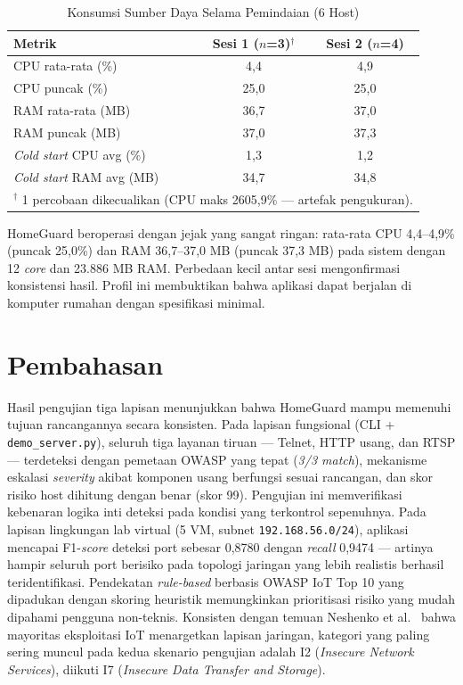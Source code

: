 \documentclass[conference]{IEEEtran}
\begin{document}
\begin{table}[htbp]
\caption{Konsumsi Sumber Daya Selama Pemindaian (6 Host)}
\label{tab:resource}
\renewcommand{\arraystretch}{1.2}
\begin{tabular}{|l|c|c|}
\hline
\textbf{Metrik} & \textbf{Sesi 1 ($n$=3)$^\dagger$} & \textbf{Sesi 2 ($n$=4)} \\
\hline
CPU rata-rata (\%) & 4,4 & 4,9 \\
\hline
CPU puncak (\%)    & 25,0 & 25,0 \\
\hline
RAM rata-rata (MB) & 36,7 & 37,0 \\
\hline
RAM puncak (MB)    & 37,0 & 37,3 \\
\hline
\textit{Cold start} CPU avg (\%) & 1,3 & 1,2 \\
\hline
\textit{Cold start} RAM avg (MB) & 34,7 & 34,8 \\
\hline
\multicolumn{3}{|l|}{$^\dagger$ 1 percobaan dikecualikan (CPU maks 2605,9\% --- artefak pengukuran).} \\
\hline
\end{tabular}
\end{table}

HomeGuard beroperasi dengan jejak yang sangat ringan: rata-rata CPU 4,4--4,9\% (puncak 25,0\%) dan RAM 36,7--37,0 MB (puncak 37,3 MB) pada sistem dengan 12 \textit{core} dan 23.886 MB RAM. Perbedaan kecil antar sesi mengonfirmasi konsistensi hasil. Profil ini membuktikan bahwa aplikasi dapat berjalan di komputer rumahan dengan spesifikasi minimal.

\section{Pembahasan}

Hasil pengujian tiga lapisan menunjukkan bahwa HomeGuard mampu memenuhi tujuan rancangannya secara konsisten. Pada lapisan fungsional (CLI + \texttt{demo\_server.py}), seluruh tiga layanan tiruan --- Telnet, HTTP usang, dan RTSP --- terdeteksi dengan pemetaan OWASP yang tepat (\textit{3/3 match}), mekanisme eskalasi \textit{severity} akibat komponen usang berfungsi sesuai rancangan, dan skor risiko host dihitung dengan benar (skor 99). Pengujian ini memverifikasi kebenaran logika inti deteksi pada kondisi yang terkontrol sepenuhnya. Pada lapisan lingkungan lab virtual (5 VM, subnet \texttt{192.168.56.0/24}), aplikasi mencapai F1-\textit{score} deteksi port sebesar 0,8780 dengan \textit{recall} 0,9474 --- artinya hampir seluruh port berisiko pada topologi jaringan yang lebih realistis berhasil teridentifikasi. Pendekatan \textit{rule-based} berbasis OWASP IoT Top 10 yang dipadukan dengan skoring heuristik memungkinkan prioritisasi risiko yang mudah dipahami pengguna non-teknis. Konsisten dengan temuan Neshenko et al.\ \cite{neshenko2019} bahwa mayoritas eksploitasi IoT menargetkan lapisan jaringan, kategori yang paling sering muncul pada kedua skenario pengujian adalah I2 (\textit{Insecure Network Services}), diikuti I7 (\textit{Insecure Data Transfer and Storage}).
\end{document}
